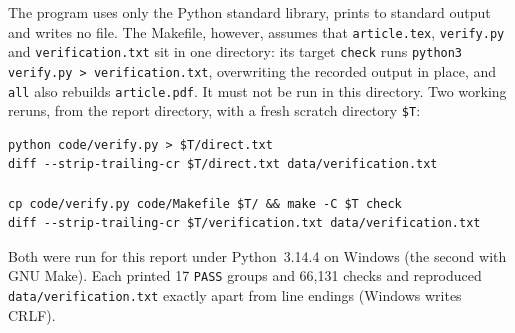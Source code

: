 \documentclass[11pt,oneside]{article}
\numberwithin{equation}{section}
\theoremstyle{definition}
\theoremstyle{remark}
\newcommand{\repo}[1]{\nolinkurl{#1}}%
\begin{document}
The program uses only the Python standard library, prints to standard
output and writes no file. The Makefile, however, assumes that
\texttt{article.tex}, \texttt{verify.py} and \texttt{verification.txt} sit in
one directory: its target \texttt{check} runs
\texttt{python3 verify.py > verification.txt}, overwriting the recorded output
in place, and \texttt{all} also rebuilds \texttt{article.pdf}. It must not
be run in this directory. Two working reruns, from the report directory,
with a fresh scratch directory \texttt{\$T}:
\begin{lstlisting}
python code/verify.py > $T/direct.txt
diff --strip-trailing-cr $T/direct.txt data/verification.txt

cp code/verify.py code/Makefile $T/ && make -C $T check
diff --strip-trailing-cr $T/verification.txt data/verification.txt
\end{lstlisting}
Both were run for this report under Python~3.14.4 on Windows (the second
with GNU Make). Each printed 17 \texttt{PASS} groups and 66,131 checks and
reproduced \repo{data/verification.txt} exactly apart from line endings
(Windows writes CRLF).
\end{document}
